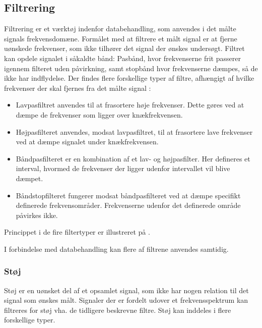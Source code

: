 \subsection{Filtrering}
Filtrering er et værktøj indenfor databehandling, som anvendes i det målte signals frekvensdomæne. Formålet med at filtrere et målt signal er at fjerne uønskede frekvenser, som ikke tilhører det signal der ønskes undersøgt. Filtret kan opdele signalet i såkaldte bånd: Pasbånd, hvor frekvenserne frit passerer igennem filteret uden påvirkning, samt stopbånd hvor frekvenserne dæmpes, så de ikke har indflydelse. 
Der findes flere forskellige typer af filtre, afhængigt af hvilke frekvenser der skal fjernes fra det målte signal \cite{Devasahayam2000}:

\begin{itemize}
	\item Lavpasfiltret anvendes til at frasortere høje frekvenser. Dette gøres ved at dæmpe de frekvenser som ligger over knækfrekvensen.
	\item Højpasfilteret anvendes, modsat lavpasfiltret, til at frasortere lave frekvenser ved at dæmpe signalet under knækfrekvensen.
	\item Båndpasfilteret er en kombination af et lav- og højpasfilter.  Her defineres et interval, hvormed de frekvenser der ligger udenfor intervallet vil blive dæmpet.
	\item Båndstopfilteret fungerer modsat båndpasfilteret ved at dæmpe specifikt definerede frekvensområder. Frekvenserne udenfor det definerede område påvirkes ikke. 
\end{itemize}
  
Princippet i de fire filtertyper er illustreret på .

I forbindelse med databehandling kan flere af filtrene anvendes samtidig. \cite{Devasahayam2000}

\subsubsection{Støj}
Støj er en uønsket del af et opsamlet signal, som ikke har nogen relation til det signal som ønskes målt. Signaler der er fordelt udover et frekvensspektrum kan filtreres for støj vha. de tidligere beskrevne filtre. \cite{Devasahayam2000}
Støj kan inddeles i flere forskellige typer.  
 

 
 
